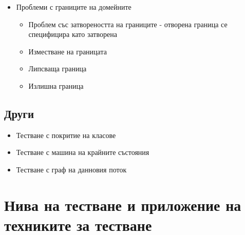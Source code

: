 \documentclass[fleqn,12pt]{article}
\begin{document}
\begin{flushleft}
\begin{itemize}
        \item Проблеми с границите на домейните
            \begin{itemize}
                \item Проблем със затвореността на границите - отворена граница се специфицира като затворена
                \item Изместване на границата
                \item Липсваща граница
                \item Излишна граница
            \end{itemize}
    \end{itemize}

\subsection{Други}
\begin{itemize}
    \item Тестване с покритие на класове
    \item Тестване с машина на крайните състояния
    \item Тестване с граф на данновия поток
\end{itemize}
 

\section{Нива на тестване и приложение на техниките за тестване}

\end{flushleft}
\end{document}
